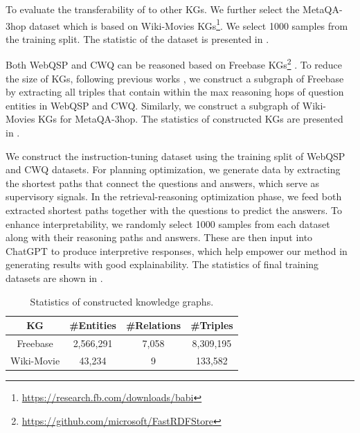 

To evaluate the transferability of \ourmethod to other KGs. We further select the MetaQA-3hop dataset \citep{zhang2018variational} which is based on Wiki-Movies KGs\footnote{\url{https://research.fb.com/downloads/babi}}. We select 1000 samples from the training split. The statistic of the dataset is presented in .

Both WebQSP and CWQ can be reasoned based on Freebase KGs\footnote{\url{https://github.com/microsoft/FastRDFStore}} \citep{bollacker2008freebase}. To reduce the size of KGs, following previous works \citep{he2021improving,jiang2022unikgqa}, we construct a subgraph of Freebase by extracting all triples that contain within the max reasoning hops of question entities in WebQSP and CWQ. Similarly, we construct a subgraph of Wiki-Movies KGs for MetaQA-3hop. The statistics of constructed KGs are presented in .

We construct the instruction-tuning dataset using the training split of WebQSP and CWQ datasets. For planning optimization, we generate data by extracting the shortest paths that connect the questions and answers, which serve as supervisory signals. In the retrieval-reasoning optimization phase, we feed both extracted shortest paths together with the questions to predict the answers. To enhance interpretability, we randomly select 1000 samples from each dataset along with their reasoning paths and answers. These are then input into ChatGPT to produce interpretive responses, which help empower our method in generating results with good explainability. The statistics of final training datasets are shown in .

\begin{table}[]
    \centering
    \caption{Statistics of constructed knowledge graphs.}
    \label{tab:kg}
    \begin{tabular}{@{}cccc@{}}
        \toprule
        KG         & \#Entities & \#Relations & \#Triples \\\midrule
        Freebase   & 2,566,291
                   & 7,058      & 8,309,195               \\
        Wiki-Movie & 43,234     & 9           & 133,582   \\

        \bottomrule
    \end{tabular}%
\end{table}

